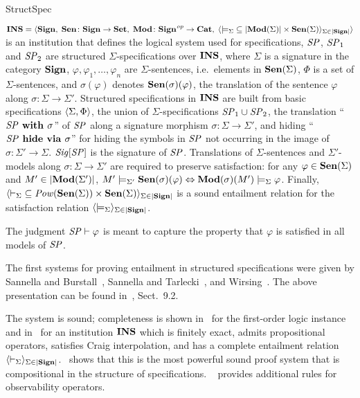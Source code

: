 \begin{entry}{StructSpec}
\begin{clarifications}
  ${\bf INS} = \langle{{\bf Sign},\; {\bf Sen}\colon{\bf Sign}\to{\bf Set},\; {\bf Mod}\colon{\bf Sign}^{\mathit{op}}\to{\bf Cat},\;
          \langle{{\models_\Sigma}\subseteq|{\bf Mod}(\Sigma)|\times{\bf Sen}(\Sigma)}\rangle_{\Sigma\in|{\bf Sign}|}}\rangle$
  is an institution that defines the logical system used for specifications,
  $\mathit{SP}$, $\mathit{SP}_1$ and $\mathit{SP}_2$ are structured $\Sigma$-specifications over ${\bf INS}$,
  where $\Sigma$ is a signature in the category ${\bf Sign}$, $\varphi, \varphi_1,
  \ldots, \varphi_n$ are $\Sigma$-sentences, i.e.\ elements in ${\bf Sen}(\Sigma)$,
  $\Phi$ is a set of $\Sigma$-sentences, and $\sigma(\varphi)$ denotes
  ${\bf Sen}(\sigma)(\varphi)$, the translation of the sentence $\varphi$ along
  $\sigma\colon\Sigma\to\Sigma'$. 
  Structured specifications in ${\bf INS}$ are built from basic specifications
  $\langle{\Sigma, \Phi}\rangle$, the union of $\Sigma$-specifications
  $\mathit{SP}_1 \cup \mathit{SP}_2$, the translation ``$\mathit{SP}\textbf{\upshape{} with }\sigma$'' of $\mathit{SP}$
  along a signature morphism $\sigma\colon\Sigma\to\Sigma'$, and hiding
  ``$\mathit{SP}\textbf{\upshape{} hide via }\sigma$'' for hiding the symbols in $\mathit{SP}$ not occurring in the
  image of $\sigma\colon\Sigma'\to\Sigma$.  $\mathit{Sig}[\mathit{SP}]$ is the signature of
  $\mathit{SP}$.
  Translations of $\Sigma$-sentences and $\Sigma'$-models along 
  $\sigma \colon \Sigma \rightarrow \Sigma'$ 
  are required to preserve satisfaction: for any
  $\varphi \in {\bf Sen}(\Sigma)$ and 
  $M' \in |{\bf Mod}(\Sigma')|$, 
  $M' \models_{\Sigma'} {\bf Sen}(\sigma)(\varphi) 
      \Leftrightarrow {\bf Mod}(\sigma)(M') \models_{\Sigma} \varphi$. 
  Finally,
  $\langle{{\vdash_\Sigma}\subseteq{\mathit{Pow}}({\bf Sen}(\Sigma))\times{\bf Sen}(\Sigma)}\rangle_{\Sigma\in|{\bf Sign}|}$
  is a sound entailment relation for the satisfaction relation
  $\langle{{\models_\Sigma}}\rangle_{\Sigma\in|{\bf Sign}|}$.
  
  The judgment $\mathit{SP} \vdash \varphi$ is meant to capture the property that
  $\varphi$ is satisfied in all models of $\mathit{SP}$.
\end{clarifications}

\begin{history}
  The first systems for proving entailment in structured specifications were
  given by Sannella and Burstall~\cite{SB83}, Sannella and Tarlecki~\cite{ST88},
  and Wirsing~\cite{Wir91}.
  The above presentation can be found in~\cite{ST12}, Sect.~9.2.
\end{history}

 \begin{technicalities}
  The system is sound; completeness is shown in~\cite{Wir91} for the first-order
  logic instance and in~\cite{Bor02,ST12} for an institution ${\bf INS}$ which is
  finitely exact, admits propositional operators, satisfies Craig interpolation,
  and has a complete entailment relation
  $\langle{{\vdash_\Sigma}}\rangle_{\Sigma\in|{\bf Sign}|}$. \cite{ST14}~shows that this is the
  most powerful sound proof system that is compositional in the structure of
  specifications.  ~\cite{RH97} provides additional rules for observability
  operators.
\end{technicalities}

\end{entry}
